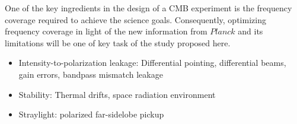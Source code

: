 One of the key ingredients in the design of a CMB experiment is the frequency coverage required to achieve the science goals. Consequently, optimizing frequency coverage in light of the new information from $Planck$ and its limitations will be one of key task of the study proposed here.   

\begin{itemize}
\item Intensity-to-polarization leakage: Differential pointing,
  differential beams, gain errors, bandpass mismatch leakage
\item Stability: Thermal drifts, space radiation environment
\item Straylight: polarized far-sidelobe pickup
\end{itemize}
